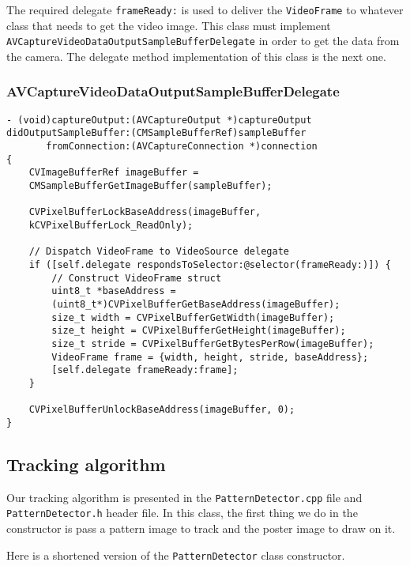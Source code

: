 The required delegate \texttt{frameReady:} is used to deliver the
\texttt{VideoFrame} to whatever class that needs to get the video image. This
class must implement
\texttt{AV\-Capture\-Video\-Data\-Output\-Sample\-Buffer\-Delegate} in order to
get the data from the camera. The delegate method implementation of this class
is the next one.

\subsubsection*{AVCaptureVideoDataOutputSampleBufferDelegate}
\begin{verbatim}
- (void)captureOutput:(AVCaptureOutput *)captureOutput
didOutputSampleBuffer:(CMSampleBufferRef)sampleBuffer
       fromConnection:(AVCaptureConnection *)connection
{
    CVImageBufferRef imageBuffer = 
    CMSampleBufferGetImageBuffer(sampleBuffer);
    
    CVPixelBufferLockBaseAddress(imageBuffer, 
    kCVPixelBufferLock_ReadOnly);
    
    // Dispatch VideoFrame to VideoSource delegate
    if ([self.delegate respondsToSelector:@selector(frameReady:)]) {
        // Construct VideoFrame struct
        uint8_t *baseAddress =
        (uint8_t*)CVPixelBufferGetBaseAddress(imageBuffer);
        size_t width = CVPixelBufferGetWidth(imageBuffer);
        size_t height = CVPixelBufferGetHeight(imageBuffer);
        size_t stride = CVPixelBufferGetBytesPerRow(imageBuffer);
        VideoFrame frame = {width, height, stride, baseAddress};
        [self.delegate frameReady:frame];
    }

    CVPixelBufferUnlockBaseAddress(imageBuffer, 0);
}
\end{verbatim}

\subsection{Tracking algorithm}
Our tracking algorithm is presented in the \texttt{PatternDetector.cpp} file
and \texttt{PatternDetector.h} header file. In this class, the first thing we
do in the constructor is pass a pattern image to track and the poster image to
draw on it.

Here is a shortened version of the \texttt{PatternDetector} class constructor.

